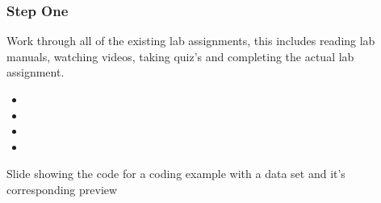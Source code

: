 \documentclass{beamer}
\begin{document}
\begin{frame}
\frametitle{Step One}

Work through all of the existing lab assignments, this includes reading lab manuals, watching videos, taking quiz's and completing the actual lab assignment.
\begin{itemize}
 \item<1-> 
 \item<2-> 
 \item<3-> 
 \item<4-> 
\end{itemize}

\end{frame}

\begin{frame}

Slide showing the code for a coding example with a data set and it's corresponding preview

\end{frame}
\end{document}
